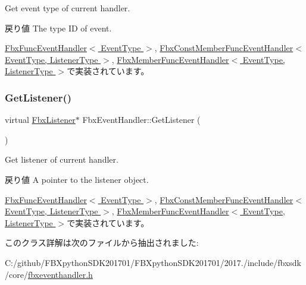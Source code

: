 Get event type of current handler. \begin{DoxyReturn}{戻り値}
The type ID of event. 
\end{DoxyReturn}


\hyperlink{class_fbx_func_event_handler_a0c1a0eaedda70615a684bd96aa72fb97}{Fbx\+Func\+Event\+Handler$<$ Event\+Type $>$}, \hyperlink{class_fbx_const_member_func_event_handler_ac88157f51fa72cba959f31dfbcdee4a5}{Fbx\+Const\+Member\+Func\+Event\+Handler$<$ Event\+Type, Listener\+Type $>$}, \hyperlink{class_fbx_member_func_event_handler_a57856423663f283503e6498a7eacb0b4}{Fbx\+Member\+Func\+Event\+Handler$<$ Event\+Type, Listener\+Type $>$}で実装されています。

\mbox{\label{class_fbx_event_handler_a6d496102fe1253372bb042840c2d45a7}} 
\subsubsection{\texorpdfstring{Get\+Listener()}{GetListener()}}
{\footnotesize\ttfamily virtual \hyperlink{class_fbx_listener}{Fbx\+Listener}$\ast$ Fbx\+Event\+Handler\+::\+Get\+Listener (\begin{DoxyParamCaption}{ }\end{DoxyParamCaption})\hspace{0.3cm}{\ttfamily [pure virtual]}}

Get listener of current handler. \begin{DoxyReturn}{戻り値}
A pointer to the listener object. 
\end{DoxyReturn}


\hyperlink{class_fbx_func_event_handler_af196b87b07e698704615056be5923745}{Fbx\+Func\+Event\+Handler$<$ Event\+Type $>$}, \hyperlink{class_fbx_const_member_func_event_handler_a9e370edd4a746ef5098d39a4f9c3d63c}{Fbx\+Const\+Member\+Func\+Event\+Handler$<$ Event\+Type, Listener\+Type $>$}, \hyperlink{class_fbx_member_func_event_handler_ad45db7b531f23f9e7776c93bec100668}{Fbx\+Member\+Func\+Event\+Handler$<$ Event\+Type, Listener\+Type $>$}で実装されています。



このクラス詳解は次のファイルから抽出されました\+:\begin{DoxyCompactItemize}
\item 
C\+:/github/\+F\+B\+Xpython\+S\+D\+K201701/\+F\+B\+Xpython\+S\+D\+K201701/2017./include/fbxsdk/core/\hyperlink{fbxeventhandler_8h}{fbxeventhandler.\+h}\end{DoxyCompactItemize}

